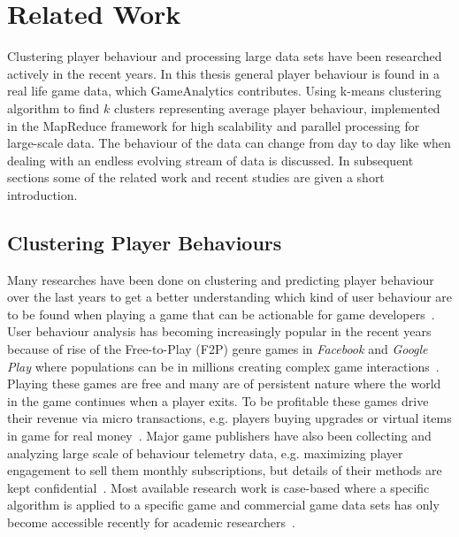 
\chapter{Related Work} %
\label{Chapter3}

Clustering player behaviour and processing large data sets have been researched actively in the recent years. In this thesis general player behaviour is found in a real life game data, which GameAnalytics contributes. Using k-means clustering algorithm to find $k$ clusters representing average player behaviour, implemented in the MapReduce framework for high scalability and parallel processing for large-scale data. The behaviour of the data can change from day to day like when dealing with an endless evolving stream of data is discussed. In subsequent sections some of the related work and recent studies are given a short introduction.

\section{Clustering Player Behaviours}
Many researches have been done on clustering and predicting player behaviour over the last years to get a better understanding which kind of user behaviour are to be found when playing a game that can be actionable for game developers~\citep{Marsh:2006Continuous, Missura2009Player, Thurau:2009SVIM, Drachen:2011Evaluating, Drachen:2012}. User behaviour analysis has becoming increasingly popular in the recent years because of rise of the Free-to-Play (F2P) genre games in \textit{Facebook} and \textit{Google Play} where populations can be in millions creating complex game interactions~\citep{Kim:2008Tracking, Drachen:2011Evaluating}. Playing these games are free and many are of persistent nature where the world in the game continues when a player exits. To be profitable these games drive their revenue via micro transactions, e.g. players buying upgrades or virtual items in game for real money~\citep{Kim:2008Tracking, Drachen:2011Evaluating, Fields:2011SocialGame, Seif:2013GameAnalytics}. Major game publishers have also been collecting and analyzing large scale of behaviour telemetry data, e.g. maximizing player engagement to sell them monthly subscriptions, but details of their methods are kept confidential~\citep{Zoeller:2010, Yannakakis:2012}. Most available research work is case-based where a specific algorithm is applied to a specific game and commercial game data sets has only become accessible recently for academic researchers~\citep{Yannakakis:2012}.

